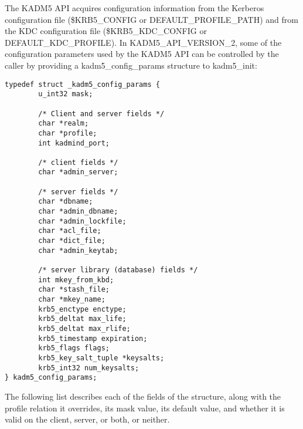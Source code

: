 The KADM5 API acquires configuration information from the Kerberos
configuration file (\$KRB5_CONFIG or DEFAULT_PROFILE_PATH) and from
the KDC configuration file (\$KRB5_KDC_CONFIG or DEFAULT_KDC_PROFILE).
In KADM5_API_VERSION_2, some of the configuration parameters used by
the KADM5 API can be controlled by the caller by providing a
kadm5_config_params structure to kadm5_init:
%
\begin{verbatim}
typedef struct _kadm5_config_params {
        u_int32 mask;

        /* Client and server fields */
        char *realm;
        char *profile;
        int kadmind_port;

        /* client fields */
        char *admin_server;

        /* server fields */
        char *dbname;
        char *admin_dbname;
        char *admin_lockfile;
        char *acl_file;
        char *dict_file;
        char *admin_keytab;

        /* server library (database) fields */
        int mkey_from_kbd;
        char *stash_file;
        char *mkey_name;
        krb5_enctype enctype;
        krb5_deltat max_life;
        krb5_deltat max_rlife;
        krb5_timestamp expiration;
        krb5_flags flags;
        krb5_key_salt_tuple *keysalts;
        krb5_int32 num_keysalts;
} kadm5_config_params;
\end{verbatim}
%
The following list describes each of the fields of the structure,
along with the profile relation it overrides, its mask value, its
default value, and whether it is valid on the client, server, or both,
or neither.
